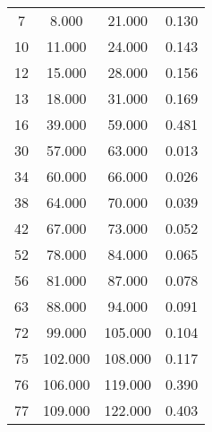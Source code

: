 % 
\begin{tabular}{cccc}
  \hline
  \hline
7 & 8.000 & 21.000 & 0.130 \\ 
  10 & 11.000 & 24.000 & 0.143 \\ 
  12 & 15.000 & 28.000 & 0.156 \\ 
  13 & 18.000 & 31.000 & 0.169 \\ 
  16 & 39.000 & 59.000 & 0.481 \\ 
  30 & 57.000 & 63.000 & 0.013 \\ 
  34 & 60.000 & 66.000 & 0.026 \\ 
  38 & 64.000 & 70.000 & 0.039 \\ 
  42 & 67.000 & 73.000 & 0.052 \\ 
  52 & 78.000 & 84.000 & 0.065 \\ 
  56 & 81.000 & 87.000 & 0.078 \\ 
  63 & 88.000 & 94.000 & 0.091 \\ 
  72 & 99.000 & 105.000 & 0.104 \\ 
  75 & 102.000 & 108.000 & 0.117 \\ 
  76 & 106.000 & 119.000 & 0.390 \\ 
  77 & 109.000 & 122.000 & 0.403 \\ 
   \hline
\end{tabular}
